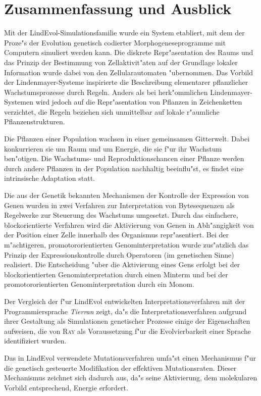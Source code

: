 \chapter{Zusammenfassung und Ausblick}

Mit der LindEvol-Simulationsfamilie wurde ein System etabliert, mit dem der Proze"s der
Evolution genetisch codierter Morphogeneseprogramme mit Computern simuliert werden kann.
Die diskrete Repr"asentation des Raums und das Prinzip der Bestimmung von Zellaktivit"aten
auf der Grundlage lokaler Information wurde dabei von den Zellularautomaten "ubernommen.
Das Vorbild der Lindenmayer-Systeme \cite{Prusinkiewicz94,RozenbergSalomaa86} inspirierte die
Beschreibung elementarer pflanzlicher Wachstumsprozesse durch Regeln. Anders als bei
herk"ommlichen Lindenmayer-Systemen wird jedoch auf die Repr"asentation von Pflanzen
in Zeichenketten verzichtet, die Regeln beziehen sich unmittelbar auf lokale r"aumliche
Pflanzenstrukturen.

Die Pflanzen einer Population wachsen in einer gemeinsamen Gitterwelt. Dabei konkurrieren
sie um Raum und um Energie, die sie f"ur ihr Wachstum ben"otigen. Die Wachstums- und
Reproduktionschancen einer Pflanze werden durch andere Pflanzen in der Population nachhaltig
beeinflu"st, es findet eine intrinsische Adaptation \cite{Packard89} statt.

Die aus der Genetik bekannten Mechanismen der Kontrolle der Expression \cite{Watson} von Genen wurden
in zwei Verfahren zur Interpretation von Bytesequenzen als Regelwerke zur Steuerung des Wachstums
umgesetzt. Durch das einfachere, blockorientierte Verfahren wird die Aktivierung von Genen
in Abh"angigkeit von der Position einer Zelle innerhalb des Organismus repr"asentiert.
Bei der m"achtigeren, promotororientierten Genominterpretation wurde zus"atzlich das
Prinzip der Expressionskontrolle durch Operatoren (im genetischen Sinne) realisiert.
Die Entscheidung "uber die Aktivierung eines Gens erfolgt bei der blockorientierten Genominterpretation
durch einen Minterm und bei der promotororientierten Genominterpretation durch ein Monom.

Der Vergleich der f"ur LindEvol entwickelten Interpretationsverfahren mit der Programmiersprache
\textsl{Tierran} \cite{Ray92} zeigt, da"s die Interpretationsverfahren aufgrund ihrer Gestaltung
als Simulationen genetischer Prozesse einige der Eigenschaften aufweisen, die von \textsc{Ray}
als Voraussetzung f"ur die Evolvierbarkeit einer Sprache identifiziert wurden.

Das in LindEvol verwendete Mutationsverfahren umfa"st einen Mechanismus f"ur die genetisch
gesteuerte Modifikation der effektiven Mutationsraten. Dieser Mechanismus zeichnet sich dadurch
aus, da"s seine Aktivierung, dem molekularen Vorbild entsprechend, Energie erfordert.

